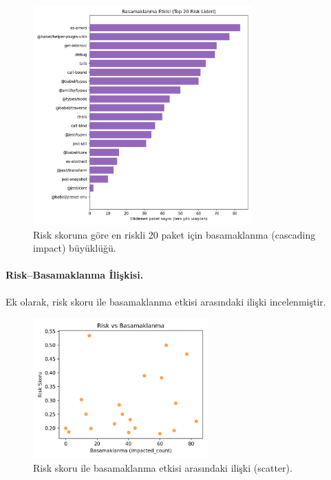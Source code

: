 \documentclass[11pt,a4paper]{article}
\begin{document}
\begin{figure}[h]
  \centering
  \includegraphics[width=0.75\textwidth]{cascade_impact_top20.png}
  \caption{Risk skoruna göre en riskli 20 paket için basamaklanma (cascading impact) büyüklüğü.}
\end{figure}

\paragraph{Risk--Basamaklanma İlişkisi.} Ek olarak, risk skoru ile basamaklanma etkisi arasındaki ilişki incelenmiştir.
\begin{figure}[h]
  \centering
  \includegraphics[width=0.6\textwidth]{risk_vs_cascade.png}
  \caption{Risk skoru ile basamaklanma etkisi arasındaki ilişki (scatter).}
\end{figure}
\end{document}
